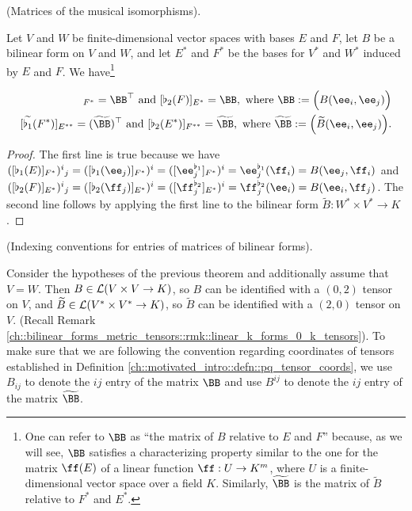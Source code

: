 \begin{theorem}
\label{ch::bilinear_forms_metric_tensors::thm::matrices_musical_isos}
    (Matrices of the musical isomorphisms).
    
    Let $V$ and $W$ be finite-dimensional vector spaces with bases $E$ and $F$, let $B$ be a bilinear form on $V$ and $W$, and let $E^*$ and $F^*$ be the bases for $V^*$ and $W^*$ induced by $E$ and $F$. We have\footnote{One can refer to $\BB$ as ``the matrix of $B$ relative to $E$ and $F$'' because, as we will see, $\BB$ satisfies a characterizing property similar to the one for the matrix $\ff(E)$ of a linear function ${\ff:U \rightarrow K^m}$, where $U$ is a finite-dimensional vector space over a field $K$. Similarly, $\widetilde{\BB}$ is the matrix of $\widetilde{B}$ relative to $F^*$ and $E^*$.}

    \begin{align*}
        [\flat_1(E)]_{F^*} = \BB^\top \text{ and } [\flat_2(F)]_{E^*} = \BB, \text{ where $\BB := \Big(B(\ee_i, \ee_j)\Big)$} \\
        [\widetilde{\flat_1}(F^*)]_{E^{**}} = (\widetilde{\BB})^\top \text{ and } [\flat_2(E^*)]_{F^{**}} = \widetilde{\BB}, \text{ where $\widetilde{\BB} := \Big(\widetilde{B}(\ee_i, \ee_j)\Big)$}. 
    \end{align*}
\end{theorem}

\begin{proof}
    The first line is true because we have $([\flat_1(E)]_{F^*})^i{}_j = ([\flat_1(\ee_j)]_{F^*})^i = ([\ee_j^{\flat_1}]_{F^*})^i = \ee_j^{\flat_1}(\ff_i) = B(\ee_j, \ff_i)$ and \\ $([\flat_2(F)]_{E^*})^i{}_j = ([\flat_2(\ff_j)]_{E^*})^i = ([\ff_j^{\flat_2}]_{E^*})^i = \ff_j^{\flat_2}(\ee_i) = B(\ee_i, \ff_j)$. The second line follows by applying the first line to the bilinear form $\widetilde{B}:W^* \times V^* \rightarrow K$.
\end{proof}
 
\begin{remark}
    (Indexing conventions for entries of matrices of bilinear forms).
    
    Consider the hypotheses of the previous theorem and additionally assume that $V = W$. Then ${B \in \mathcal{L}(V \times V \rightarrow K)}$, so $B$ can be identified with a $(0, 2)$ tensor on $V$, and $\widetilde{B} \in \mathcal{L}(V^* \times V^* \rightarrow K)$, so $\widetilde{B}$ can be identified with a $(2, 0)$ tensor on $V$. (Recall Remark \ref{ch::bilinear_forms_metric_tensors::rmk::linear_k_forms_0_k_tensors}). To make sure that we are following the convention regarding coordinates of tensors established in Definition \ref{ch::motivated_intro::defn::pq_tensor_coords}, we use $B_{ij}$ to denote the $ij$ entry of the matrix $\BB$ and use $B^{ij}$ to denote the $ij$ entry of the matrix $\widetilde{\BB}$.
\end{remark}
 
